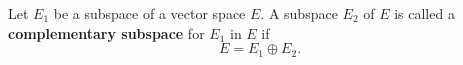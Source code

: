 Let $E_1$ be a subspace of a vector space $E$. A subspace $E_2$ of $E$ is called a \textbf{complementary subspace} for $E_1$ in $E$ if
$$E = E_1 \oplus E_2.$$
